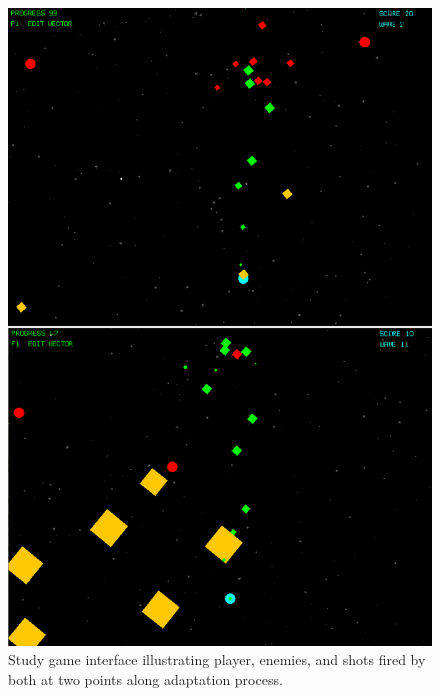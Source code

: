 \documentclass{sig-alternate}
\begin{document}
\begin{figure}[t]
\centering
\includegraphics[width=1\linewidth]{./bullethell_topbybottom}
\caption{Study game interface illustrating player, enemies, and shots fired by both at two points along adaptation process.}
\label{fig:shmup}
\end{figure}
\end{document}
